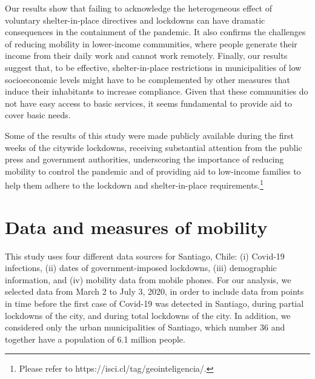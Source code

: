 Our results show that  failing to acknowledge the heterogeneous effect of voluntary shelter-in-place directives and lockdowns can have dramatic consequences in the containment of the pandemic. It also confirms the challenges of reducing mobility in lower-income communities, where people generate their income from their daily work and cannot work remotely. Finally, our results suggest that, to be effective, shelter-in-place restrictions in municipalities of low socioeconomic levels might have to be complemented by other measures that induce their inhabitants to increase compliance. Given that these communities do not have easy access to basic services, it seems fundamental to provide aid to cover basic needs.
 
Some of the results of this study were made publicly available during the first weeks of the citywide lockdowns, receiving substantial attention from the public press and government authorities, underscoring the importance of reducing mobility to control the pandemic and of providing aid to low-income families to help them adhere to the lockdown and shelter-in-place requirements.\footnote{Please refer to https://isci.cl/tag/geointeligencia/.}


\section{Data and measures of mobility}

This study uses four different data sources for Santiago, Chile: (i) Covid-19 infections, (ii) dates of government-imposed lockdowns, (iii) demographic information, and (iv) mobility data from mobile phones. For our analysis, we selected data from March 2 to July 3, 2020, in order to include data from points in time before the first case of Covid-19 was detected in Santiago, during partial lockdowns of the city, and during total lockdowns  of the city. In addition, we considered only the urban municipalities of Santiago, which number 36 and together have a population of 6.1 million people. 

